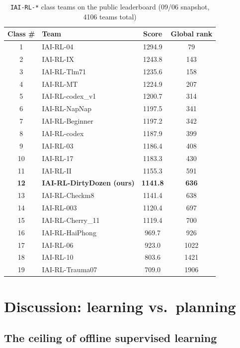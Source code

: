 \documentclass[conference]{IEEEtran}
\begin{document}
\begin{table}[htbp]
\caption{\texttt{IAI-RL-*} class teams on the public leaderboard (09/06 snapshot, 4106 teams total)}
\label{tab:lb}
\centering
\small
\begin{tabular}{clcc}
\toprule
\textbf{Class \#} & \textbf{Team} & \textbf{Score} & \textbf{Global rank} \\
\midrule
1 & IAI-RL-04 & 1294.9 & 79 \\
2 & IAI-RL-IX & 1243.8 & 143 \\
3 & IAI-RL-Tlm71 & 1235.6 & 158 \\
4 & IAI-RL-MT & 1224.9 & 207 \\
5 & IAI-RL-codex\_v1 & 1200.7 & 314 \\
6 & IAI-RL-NapNap & 1197.5 & 341 \\
7 & IAI-RL-Beginner & 1197.2 & 342 \\
8 & IAI-RL-codex & 1187.9 & 399 \\
9 & IAI-RL-03 & 1186.4 & 408 \\
10 & IAI-RL-17 & 1183.3 & 430 \\
11 & IAI-RL-II & 1155.3 & 591 \\
\textbf{12} & \textbf{IAI-RL-DirtyDozen (ours)} & \textbf{1141.8} & \textbf{636} \\
13 & IAI-RL-Checkm8 & 1141.4 & 638 \\
14 & IAI-RL-003 & 1120.4 & 697 \\
15 & IAI-RL-Cherry\_11 & 1119.4 & 700 \\
16 & IAI-RL-HaiPhong & 969.7 & 926 \\
17 & IAI-RL-06 & 923.0 & 1022 \\
18 & IAI-RL-10 & 803.6 & 1421 \\
19 & IAI-RL-Trauma07 & 709.0 & 1906 \\
\bottomrule
\end{tabular}
\end{table}

\section{Discussion: learning vs.\ planning}
\label{sec:discussion}

\subsection{The ceiling of offline supervised learning}
\end{document}
